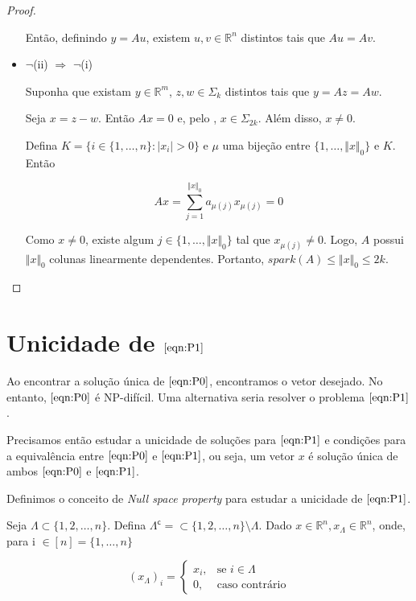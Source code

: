 \begin{proof}
\begin{itemize}
Então, definindo $y = Au$, existem $u, v \in \mathbb{R}^n$ distintos tais que $Au = Av$.
\item $\neg$(ii) $\Rightarrow$ $\neg$(i)

Suponha que existam $y \in \mathbb{R}^m$, $z, w \in \Sigma_k$ distintos tais que $y = Az = Aw$.

Seja $x = z - w$. Então $Ax = 0$ e, pelo , $x \in \Sigma_{2k}$. Além disso, $x \neq 0$.

Defina $K = \lbrace i \in \lbrace 1, \hdots, n \rbrace: \vert x_i \vert > 0 \rbrace$ e $\mu$ uma bijeção entre $\lbrace 1, \hdots, \Vert x \Vert_0 \rbrace$ e $K$. Então

$$ Ax = \sum_{j = 1}^{\Vert x \Vert_0} a_{\mu(j)} x_{\mu(j)} = 0$$

Como $x \neq 0$, existe algum $j \in \lbrace 1, \hdots, \Vert x \Vert_0 \rbrace$ tal que $x_{\mu(j)} \neq 0$. Logo, $A$ possui $\Vert x \Vert_0$ colunas linearmente dependentes. Portanto, $\textit{spark}(A) \leq \Vert x \Vert_0 \leq 2k$.
\end{itemize}
\end{proof}
\section{Unicidade de $\eqref{eqn:P1}$}

Ao encontrar a solução única de $\eqref{eqn:P0}$, encontramos o vetor desejado. No entanto, $\eqref{eqn:P0}$ é NP-difícil. Uma alternativa seria resolver o problema $\eqref{eqn:P1}$.

Precisamos então estudar a unicidade de soluções para $\eqref{eqn:P1}$ e condições para a equivalência entre $\eqref{eqn:P0}$ e $\eqref{eqn:P1}$, ou seja,  um vetor $x$ é solução única de ambos $\eqref{eqn:P0}$ e $\eqref{eqn:P1}$.

Definimos o conceito de \textit{Null space property} para estudar a unicidade de $\eqref{eqn:P1}$.

\begin{definicao} Seja $\Lambda \subset \lbrace 1, 2, \hdots, n \rbrace$. Defina $\Lambda^{\mathsf{c}} = \subset \lbrace 1, 2, \hdots, n \rbrace \setminus \Lambda$. Dado $x \in \mathbb{R}^n, x_{\Lambda} \in \mathbb{R}^n$, onde, para i $\in [n] = \{1, \hdots, n\}$

$$(x_{\Lambda})_i = 
\begin{cases}
x_i, &\mbox{se } i \in \Lambda \\
0,   &\mbox{caso contrário}
\end{cases}$$

\end{definicao}

